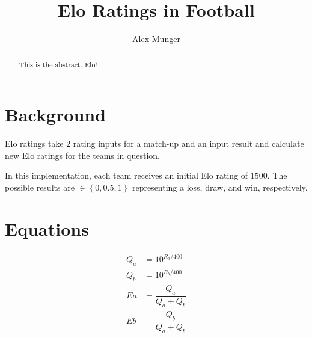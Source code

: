 \documentclass{article}
\title{Elo Ratings in Football}
\author{Alex Munger}
\begin{document}
\maketitle

\begin{abstract}
	This is the abstract. Elo!
\end{abstract}

\section{Background}

Elo ratings take 2 rating inputs for a match-up and an input result and calculate new Elo ratings for the teams in question.

In this implementation, each team receives an initial Elo rating of $ 1500 $. The possible results are $ \in \left\lbrace 0, 0.5, 1 \right\rbrace $ representing a loss, draw, and win, respectively.

\section{Equations}

\begin{align*}
	Q_{a} &= 10^{R_{a} / 400} \\
	Q_{b} &= 10^{R_{b} / 400} \\
	E{a} &= \dfrac{Q_{a}}{Q_{a} + Q_{b}} \\
	E{b} &= \dfrac{Q_{b}}{Q_{a} + Q_{b}} \\
\end{align*}
\end{document}

